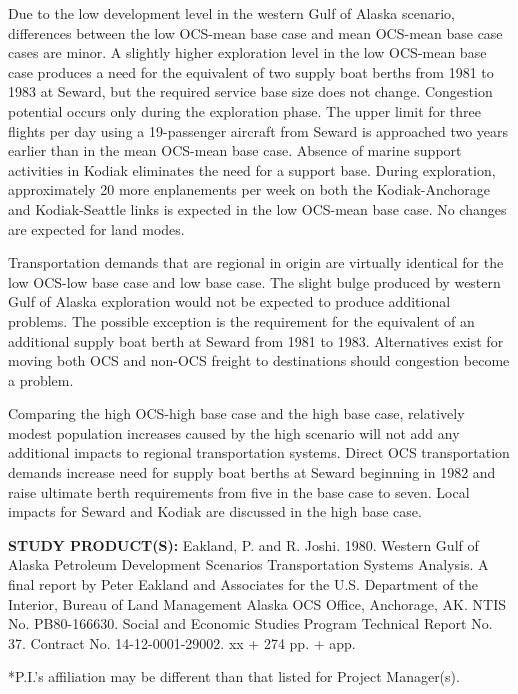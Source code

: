 \documentclass[11pt,a4paper]{article}
\begin{document}
Due to the low development level in the western Gulf of Alaska scenario, differences between the low OCS-mean base case and mean OCS-mean base case cases are minor.  A slightly higher exploration level in the low OCS-mean base case produces a need for the equivalent of two supply boat berths from 1981 to 1983 at Seward, but the required service base size does not change.  Congestion potential occurs only during the exploration phase.  The upper limit for three flights per day using a 19-passenger aircraft from Seward is approached two years earlier than in the mean OCS-mean base case.  Absence of marine support activities in Kodiak eliminates the need for a support base.  During exploration, approximately 20 more enplanements per week on both the Kodiak-Anchorage and Kodiak-Seattle links is expected in the low OCS-mean base case.  No changes are expected for land modes.

Transportation demands that are regional in origin are virtually identical for the low OCS-low base case and low base case.  The slight bulge produced by western Gulf of Alaska exploration would not be expected to produce additional problems.  The possible exception is the requirement for the equivalent of an additional supply boat berth at Seward from 1981 to 1983.  Alternatives exist for moving both OCS and non-OCS freight to destinations should congestion become a problem.

Comparing the high OCS-high base case and the high base case, relatively modest population increases caused by the high scenario will not add any additional impacts to regional transportation systems.  Direct OCS transportation demands increase need for supply boat berths at Seward beginning in 1982 and raise ultimate berth requirements from five in the base case to seven.  Local impacts for Seward and Kodiak are discussed in the high base case.

\textbf{STUDY PRODUCT(S):} Eakland, P. and R. Joshi.  1980.  Western Gulf of Alaska Petroleum Development Scenarios Transportation Systems Analysis.  A final report by Peter Eakland and Associates for the U.S. Department of the Interior, Bureau of Land Management Alaska OCS Office, Anchorage, AK.  NTIS No. PB80-166630.  Social and Economic Studies Program Technical Report No. 37.  Contract No. 14-12-0001-29002.  xx + 274 pp. + app.

*P.I.'s affiliation may be different than that listed for Project Manager(s).
\end{document}
